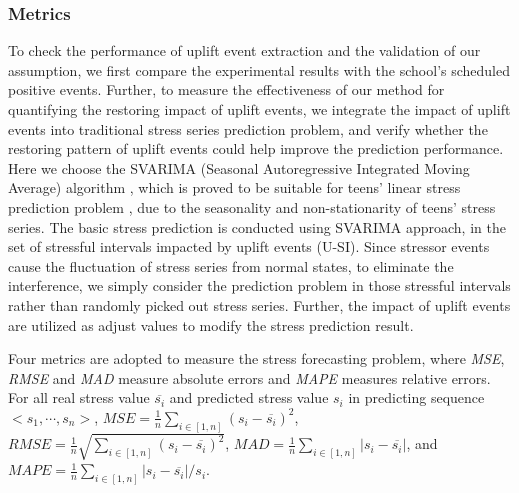 \subsubsection{Metrics}
To check the performance of uplift event extraction and the validation of our assumption,
we first compare the experimental results with the school's scheduled positive events.
Further, to measure the effectiveness of our method for quantifying the restoring impact of uplift events,
we integrate the impact of uplift events into traditional stress series prediction problem,
and verify whether the restoring pattern of uplift events could help improve the prediction performance.
Here we choose the SVARIMA (Seasonal Autoregressive Integrated Moving Average) algorithm \cite{Shumway2006Time},
which is proved to be suitable for teens' linear stress prediction problem \cite{Li2015Predicting},
due to the seasonality and non-stationarity of teens' stress series.
The basic stress prediction is conducted using SVARIMA approach,
in the set of stressful intervals impacted by uplift events (U-SI).
Since stressor events cause the fluctuation of stress series from normal states,
to eliminate the interference,
we simply consider the prediction problem in those stressful intervals rather than randomly picked out stress series.
Further, the impact of uplift events are utilized as adjust values to modify the stress prediction result.

Four metrics are adopted to measure the stress forecasting problem,
where \emph{MSE}, \emph{RMSE} and \emph{MAD} measure absolute errors and \emph{MAPE} measures relative errors.
For all real stress value $\overline{s_i}$ and predicted stress value $s_i$ in predicting sequence $<s_1,\cdots,s_n>$,
$MSE = \frac{1}{n}\sum_{i\in[1,n]}(s_i-\overline{s_i})^2$,
$RMSE = \frac{1}{n}\sqrt{\sum_{i\in[1,n]}(s_i-\overline{s_i})^2}$,
$MAD = \frac{1}{n}\sum_{i\in[1,n]}|s_i-\overline{s_i}|$,
and $MAPE = \frac{1}{n}\sum_{i\in[1,n]}{|s_i-\overline{s_i}|/s_i}$.

